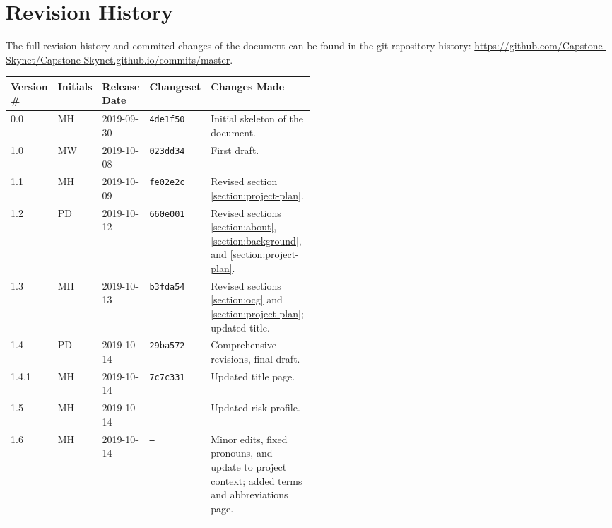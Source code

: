 \thispagestyle{empty}
\section*{Revision History}
The full revision history and commited changes of the document can be found in the git repository history: \href{https://github.com/Capstone-Skynet/Capstone-Skynet.github.io}{https://github.com/Capstone-Skynet/Capstone-Skynet.github.io/commits/master}.

\begin{table}[H]
\begin{tabular}{*{4}{l}p{0.5\linewidth}}
\hline
Version \# & Initials & Release Date & Changeset & Changes Made \\ \hline

0.0 & MH & 2019-09-30 & \texttt{4de1f50} & Initial skeleton of the document.\\
1.0 & MW & 2019-10-08 & \texttt{023dd34} & First draft.\\
1.1 & MH & 2019-10-09 & \texttt{fe02e2c} & Revised section \ref{section:project-plan}.\\
1.2 & PD & 2019-10-12 & \texttt{660e001} & Revised sections \ref{section:about}, \ref{section:background}, and \ref{section:project-plan}.\\
1.3 & MH & 2019-10-13 & \texttt{b3fda54} & Revised sections \ref{section:ocg} and \ref{section:project-plan}; updated title.\\
1.4 & PD & 2019-10-14 & \texttt{29ba572} & Comprehensive revisions, final draft.\\
1.4.1 & MH & 2019-10-14 & \texttt{7c7c331} & Updated title page. \\
1.5 & MH & 2019-10-14 & \texttt{--} & Updated risk profile. \\
1.6 & MH & 2019-10-14 & \texttt{--} & Minor edits, fixed pronouns, and update to project context; added terms and abbreviations page.\\

 & & & \\ \hline
\end{tabular}
\end{table}